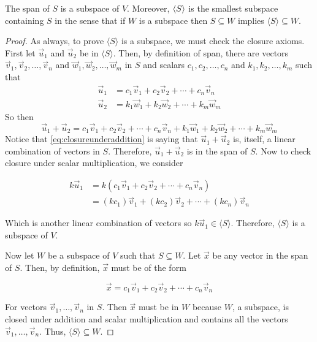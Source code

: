 \begin{theorem}
	The span of $S$ is a subspace of $V$. Moreover, $\langle S \rangle$ is the smallest subspace containing $S$ in the sense that if $W$ is a subspace then $S \subseteq W$ implies $\langle S \rangle \subseteq W$.
\end{theorem}

\begin{proof}
	As always, to prove $\langle S \rangle$ is a subspace, we must check the closure axioms. First let $\vec{u}_1$ and $\vec{u}_2$ be in $\langle S \rangle$. Then, by definition of span, there are vectors $\vec{v}_1, \vec{v}_2, \ldots, \vec{v}_n$ and $\vec{w}_1,\vec{w}_2,\ldots,\vec{w}_m$ in $S$ and scalars $c_1, c_2, \ldots, c_n$ and $k_1, k_2, \ldots, k_m$ such that
	\begin{align}
	\vec{u}_1 &= c_1 \vec{v}_1 + c_2 \vec{v}_2 + \cdots + c_n \vec{v}_n \\
	\vec{u}_2 &= k_1 \vec{w}_1 + k_2 \vec{w}_2 + \cdots + k_m \vec{w}_m
	\end{align}
	So then
	\begin{equation}
	\vec{u}_1 + \vec{u}_2 = c_1 \vec{v}_1 + c_2 \vec{v}_2 + \cdots + c_n \vec{v}_n + k_1 \vec{w}_1 + k_2 \vec{w}_2 + \cdots + k_m \vec{w}_m \label{eq:closureunderaddition}
	\end{equation}
	Notice that \eqref{eq:closureunderaddition} is saying that $\vec{u}_1 + \vec{u}_2$ is, itself, a linear combination of vectors in $S$. Therefore, $\vec{u}_1 + \vec{u}_2$ is in the span of $S$. Now to check closure under scalar multiplication, we consider
	
	\begin{align}
	k\vec{u}_1 &= k(c_1\vec{v}_1 + c_2\vec{v}_2 + \cdots + c_n\vec{v}_n) \nonumber \\
					&= (kc_1) \vec{v}_1 + (kc_2) \vec{v}_2 + \cdots + (kc_n) \vec{v}_n
	\end{align}
	
	Which is another linear combination of vectors so $k\vec{u}_1 \in \langle S \rangle$. Therefore, $\langle S \rangle$ is a subspace of $V$.
	
	Now let $W$ be a subspace of $V$ such that $S \subseteq W$. Let $\vec{x}$ be any vector in the span of $S$. Then, by definition, $\vec{x}$ must be of the form
	
	\begin{equation}
		\vec{x} = c_1 \vec{v}_1 + c_2\vec{v}_2 + \cdots + c_n \vec{v}_n
	\end{equation}
	
	For vectors $\vec{v}_1, \ldots, \vec{v}_n$ in $S$. Then $\vec{x}$ must be in $W$ because $W$, a subspace, is closed under addition and scalar multiplication and contains all the vectors $\vec{v}_1,\ldots,\vec{v}_n$. Thus, $\langle S \rangle \subseteq W$.
\end{proof}

